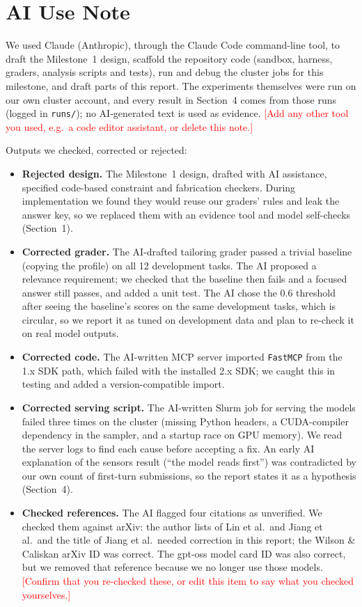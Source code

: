 \documentclass[11pt]{article}
\newcommand{\fillin}[1]{\textcolor{red}{[#1]}}
\begin{document}
\section*{AI Use Note}

We used Claude (Anthropic), through the Claude Code command-line tool, to draft the Milestone~1 design, scaffold the repository code (sandbox, harness, graders, analysis scripts and tests), run and debug the cluster jobs for this milestone, and draft parts of this report. The experiments themselves were run on our own cluster account, and every result in Section~4 comes from those runs (logged in \texttt{runs/}); no AI-generated text is used as evidence. \fillin{Add any other tool you used, e.g.\ a code editor assistant, or delete this note.}

Outputs we checked, corrected or rejected:
\begin{itemize}
  \item \textbf{Rejected design.} The Milestone~1 design, drafted with AI assistance, specified code-based constraint and fabrication checkers. During implementation we found they would reuse our graders' rules and leak the answer key, so we replaced them with an evidence tool and model self-checks (Section~1).
  \item \textbf{Corrected grader.} The AI-drafted tailoring grader passed a trivial baseline (copying the profile) on all 12 development tasks. The AI proposed a relevance requirement; we checked that the baseline then fails and a focused answer still passes, and added a unit test. The AI chose the 0.6 threshold after seeing the baseline's scores on the same development tasks, which is circular, so we report it as tuned on development data and plan to re-check it on real model outputs.
  \item \textbf{Corrected code.} The AI-written MCP server imported \texttt{FastMCP} from the 1.x SDK path, which failed with the installed 2.x SDK; we caught this in testing and added a version-compatible import.
  \item \textbf{Corrected serving script.} The AI-written Slurm job for serving the models failed three times on the cluster (missing Python headers, a CUDA-compiler dependency in the sampler, and a startup race on GPU memory). We read the server logs to find each cause before accepting a fix. An early AI explanation of the sensors result (``the model reads first'') was contradicted by our own count of first-turn submissions, so the report states it as a hypothesis (Section~4).
  \item \textbf{Checked references.} The AI flagged four citations as unverified. We checked them against arXiv: the author lists of Lin et al.\ and Jiang et al.\ and the title of Jiang et al.\ needed correction in this report; the Wilson \& Caliskan arXiv ID was correct. The gpt-oss model card ID was also correct, but we removed that reference because we no longer use those models. \fillin{Confirm that you re-checked these, or edit this item to say what you checked yourselves.}
\end{itemize}
\end{document}
